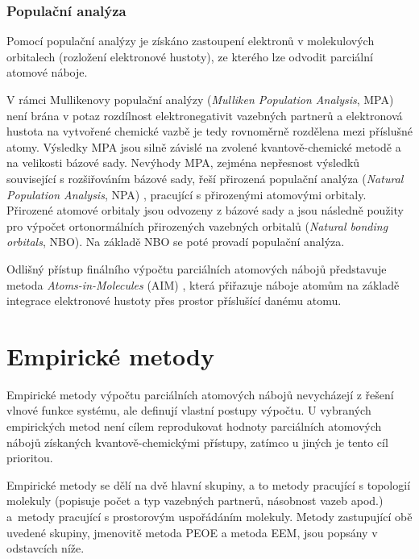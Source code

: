 \subsubsection{Populační analýza}
Pomocí populační analýzy je získáno zastoupení elektronů v molekulových orbitalech (rozložení elektronové hustoty), ze kterého lze odvodit parciální atomové náboje. 

V rámci Mullikenovy populační analýzy (\textit{Mulliken Population Analysis}, MPA) \cite{MPA} není brána v potaz rozdílnost elektronegativit vazebných partnerů a elektronová hustota na vytvořené chemické vazbě je tedy rovnoměrně rozdělena mezi příslušné atomy. Výsledky MPA jsou silně závislé na zvolené kvantově-chemické metodě a na velikosti bázové sady. Nevýhody MPA, zejména nepřesnost výsledků související s rozšiřováním bázové sady, řeší přirozená populační analýza (\textit{Natural Population Analysis}, NPA) \cite{NPA}, pracující s přirozenými atomovými orbitaly. Přirozené atomové orbitaly jsou odvozeny z bázové sady a jsou následně použity pro výpočet ortonormálních přirozených vazebných orbitalů (\textit{Natural bonding orbitals}, NBO). Na základě NBO se poté provadí populační analýza.

Odlišný přístup finálního výpočtu parciálních atomových nábojů představuje metoda \textit{Atoms-in-Molecules} (AIM) \cite{AIM}, která přiřazuje náboje atomům na základě integrace elektronové hustoty přes prostor příslušící danému atomu. 

\section{Empirické metody}
Empirické metody výpočtu parciálních atomových nábojů nevycházejí z řešení vlnové funkce systému, ale definují vlastní postupy výpočtu. U vybraných empirických metod není cílem reprodukovat hodnoty parciálních atomových nábojů získaných kvanto\-vě-chemickými přístupy, zatímco u jiných je tento cíl prioritou.

Empirické metody se dělí na dvě hlavní skupiny, a to metody pracující s topologií molekuly (popisuje počet a typ vazebných partnerů, násobnost vazeb apod.) a~metody pracující s prostorovým uspořádáním molekuly. Metody zastupující obě uvedené skupiny, jmenovitě metoda PEOE a metoda EEM, jsou popsány v odstavcích níže.

